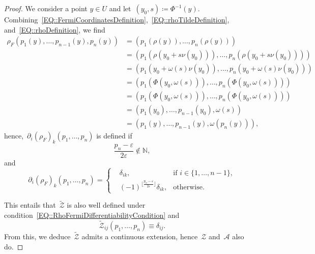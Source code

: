 \documentclass[12pt,a4paper]{amsart}
\numberwithin{equation}{section}
\theoremstyle{definition}
\theoremstyle{remark}
\newcommand{\N}{\mathbb{N}}
\newcommand{\eps}{\varepsilon}
\begin{document}
\begin{proof}
    We consider a point $y \in U$ and let~$(y_0, s) \coloneq \Phi^{-1}(y)$. Combining~\eqref{EQ::FermiCoordinatesDefinition},~\eqref{EQ::rhoTildeDefinition}, and~\eqref{EQ::rhoDefinition}, we find
    \begin{equation}
        \begin{split}
            \rho_F(p_1(y),\dots,p_{n-1}(y), p_n(y)) &= (p_1(\rho(y)),\dots,p_n(\rho(y))) \\
                &= (p_1(\rho(y_0+s\nu(y_0))),\dots,p_n(\rho(y_0+s\nu(y_0)))) \\
                &= (p_1(y_0 + \omega(s)\nu(y_0)),\dots,p_n(y_0 + \omega(s)\nu(y_0)))\\
                &= (p_1(\Phi(y_0, \omega(s))),\dots,p_n(\Phi(y_0, \omega(s))))\\
                &= (p_1(\Phi(y_0, \omega(s))),\dots,p_n(\Phi(y_0, \omega(s))))\\
                &= (p_1(y_0),\dots,p_{n-1}(y_0),\omega(s))\\
                &= (p_1(y),\dots,p_{n-1}(y),\omega(p_n(y))),
        \end{split}
    \end{equation}
    hence,~$\partial_i {(\rho_{F})}_k(p_1,\dots,p_n)$ is defined if
    \begin{equation}\label{EQ::RhoFermiDifferentiabilityCondition}
        \frac{p_n-\eps}{2\eps}\notin \N,
    \end{equation}
    and
    \begin{equation}
        \partial_i {(\rho_{F})}_k(p_1,\dots,p_n) =  \left\{\begin{aligned}
                                                        &\delta_{ik},&\text{if }i \in \{1,\dots,n-1\},\\
                                                        &{(-1)}^{\lfloor\frac{p_n-\eps}{2\eps}\rfloor}\delta_{ik},&\text{otherwise}.
                                                    \end{aligned}\right.
    \end{equation}

    This entails that~$\tilde{\mathcal{Z}}$ is also well defined under condition~\eqref{EQ::RhoFermiDifferentiabilityCondition} and
    \begin{equation}
        \tilde{\mathcal{Z}}_{ij}(p_1,\dots,p_n) \equiv \delta_{ij}.
    \end{equation}
    From this, we deduce~$\tilde{\mathcal{Z}}$ admits a continuous extension, hence~$\mathcal{Z}$ and~$\mathcal{A}$ also do.


\end{proof}
\end{document}
